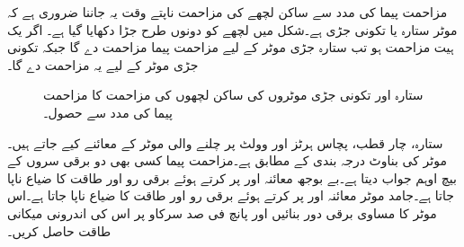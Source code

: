 مزاحمت پیما کی مدد سے ساکن لچھے کی مزاحمت ناپتے وقت یہ جاننا ضروری ہے کہ موٹر ستارہ یا تکونی جڑی ہے۔شکل   میں لچھے کو دونوں طرح جڑا دکھایا گیا ہے۔ اگر یک ہیت مزاحمت   ہو تب ستارہ جڑی موٹر کے لیے مزاحمت پیما   مزاحمت دے گا جبکہ تکونی جڑی موٹر کے لیے یہ  مزاحمت دے گا۔
\begin{figure}
\centering
\begin{subfigure}{0.50\textwidth}
\centering
{}
\end{subfigure}\hfill
\begin{subfigure}{0.40\textwidth}
\centering
{}
\end{subfigure}
\caption{ستارہ اور تکونی جڑی موٹروں کی ساکن لچھوں کی مزاحمت کا مزاحمت پیما کی مدد سے حصول۔}
\label{شکل_امالی_ساکن_مزاحمت_کا_حصول}
\end{figure}

ستارہ، چار قطب، پچاس ہرٹز اور  وولٹ پر چلنے والی موٹر کے معائنے کیے جاتے ہیں۔ موٹر کی بناوٹ درجہ بندی   کے مطابق ہے۔مزاحمت پیما کسی بھی دو برقی سروں کے بیچ  اوہم جواب دیتا ہے۔بے بوجھ معائنہ  اور  پر کرتے ہوئے برقی رو  اور طاقت کا ضیاع  ناپا جاتا ہے۔جامد موٹر معائنہ   اور  پر کرتے ہوئے برقی رو  اور طاقت کا ضیاع  ناپا جاتا ہے۔اس موٹر کا مساوی برقی دور بنائیں اور پانچ فی صد سرکاو پر اس کی اندرونی میکانی طاقت حاصل کریں۔

